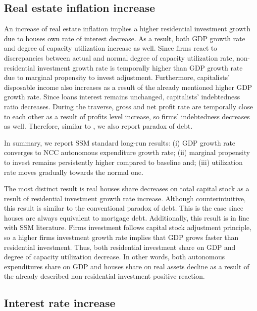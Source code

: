 \documentclass[12pt, a4]{article}
\begin{document}
\subsection{Real estate inflation increase}
\label{sec:org7159143}
\label{sec:Exp2}


An increase of real estate inflation implies a higher residential investment growth due to houses own rate of interest decrease.
As a result, both GDP growth rate and degree of capacity utilization increase as well.
Since firms react to discrepancies between actual and normal degree of capacity utilization rate, non-residential investment growth rate 
is temporally higher than GDP growth rate due to marginal propensity to invest adjustment.
Furthermore, capitalists' disposable income also increases as a result of the already mentioned higher GDP growth rate.
Since loans interest remains unchanged, capitalists' indebtedness ratio decreases.
During the traverse, gross and net profit rate are temporally close to each other as a result of profits level increase, so firms' indebtedness decreases as well.
Therefore, similar to \textcite{mandarino-2020-worker-debt}, we also report paradox of debt.

In summary, we report SSM standard long-run results:
    (i) GDP growth rate converges to NCC autonomous expenditure growth rate;
    (ii) marginal propensity to invest remains persistently higher compared to baseline and;
    (iii) utilization rate moves gradually towards the normal one.


The most distinct result is real houses share decreases on total capital stock as a result of residential investment growth rate increase.
Although counterintuitive, this result is similar to the conventional paradox of debt.
This is the case since houses are always equivalent to  mortgage debt.
Additionally, this result is in line with SSM literature.
Firms investment follows capital stock adjustment principle, so a higher firms investment growth rate implies that
GDP grows faster than residential investment.
Thus, both residential investment share on GDP and degree of capacity  utilization decrease.
In other words, both autonomous expenditures share on GDP and houses share on real assets decline as a result of the already described non-residential investment positive reaction.
\subsection{Interest rate increase}
\label{sec:org5dbbc3d}
\label{sec:Exp3}
\end{document}
